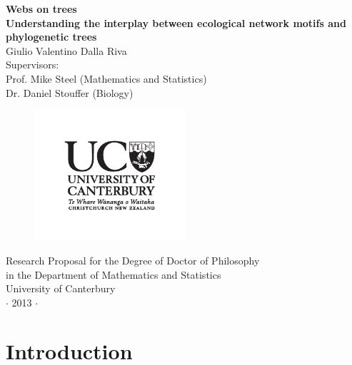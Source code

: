 \documentclass[12pt,a4paper]{report}
\begin{document}
\pagestyle{empty}
\begin{center}
{\Large \textbf{Webs on trees}\\}
{\large \textbf{Understanding the interplay between ecological network motifs and phylogenetic trees\\}}
\vspace{1cm}
{\large 
Giulio Valentino Dalla Riva\\
\vspace{0.5cm}
Supervisors: \\
Prof. Mike Steel (Mathematics and Statistics)\\
Dr. Daniel Stouffer (Biology)}\\
\end{center}

\begin{figure}[ht]
	\centering
		\includegraphics[width=0.5\textwidth]{images/UClogo}
\end{figure}

\vspace{1cm}
\begin{center}
{\large  
Research Proposal for the Degree of Doctor of Philosophy\\
in the Department of Mathematics and Statistics\\
University of Canterbury\\
\vspace{0.3cm}
$\cdot$ 2013 $\cdot$}
\end{center}
\vspace{1cm}
\tableofcontents


\chapter{Introduction}
\end{document}
